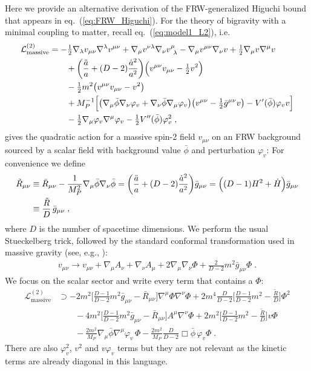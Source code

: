 \documentclass[11pt,a4paper]{article}
\newcommand{\ba}[1]{\begin{align} #1 \end{align}}
\newcommand{\bes}[1]{\begin{equation}\begin{split} #1 \end{split}\end{equation}}
\newcommand{\Lcal}{\mathcal{L}}
\newcommand{\MP}{M_P}
\newcommand{\eref}[1]{eq.~(\ref{#1})}
\begin{document}
\begin{appendix}
Here we provide an alternative derivation of the FRW-generalized Higuchi bound that appears in \eref{eq:FRW_Higuchi}.  For the theory of bigravity with a minimal coupling to matter, recall  \eref{eq:model1_L2}, i.e. 
\bes{
    \Lcal_\mathrm{massive}^{(2)}
    & = 
    -\tfrac{1}{2} \nabla_\lambda v_{\mu\nu} \nabla^\lambda v^{\mu\nu} 
    + \nabla_\mu v^{\nu\lambda} \nabla_\nu v^\mu_{~ \lambda} 
    - \nabla_\mu v^{\mu\nu} \nabla_\nu v 
    + \tfrac{1}{2} \nabla_\mu v \nabla^\mu v 
    \\ & \qquad 
    + \biggl( \frac{\ddot{a}}{a}+(D-2)\frac{\dot{a}^2}{a^2} \biggr)
    \Bigl( v^{\mu\nu} v_{\mu\nu} -\tfrac{1}{2} v^2 \Bigr) 
    \\ & \qquad 
    - \tfrac{1}{2}m^2 \bigl( v^{\mu\nu} v_{\mu\nu} - v^2 \bigr) 
    \\ & \qquad 
    + \MP^{-1} \Bigl[ \bigl( \nabla_\mu \bar{\phi} \nabla_\nu \varphi_v+\nabla_\nu \bar{\phi} \nabla_\mu \varphi_v \bigr) \bigl( v^{\mu\nu} - \tfrac{1}{2} \bar{g}^{\mu\nu} v \bigr) -V'(\bar{\phi}) \varphi_v v \Bigr] 
    \\ & \qquad 
    - \tfrac{1}{2} \nabla_\mu \varphi_v \nabla^\mu \varphi_v 
    - \tfrac{1}{2} V''(\bar{\phi}) \varphi_v^2
    \;,
}
gives the quadratic action for a massive spin-2 field $v_{\mu\nu}$ on an FRW background sourced by a scalar field with background value $\bar{\phi}$ and perturbation $\varphi_v$: 
For convenience we define
\ba{
    \tilde{R}_{\mu\nu} 
    & \equiv \bar{R}_{\mu\nu} - \frac{1}{\MP^2} \nabla_\mu \bar{\phi} \nabla_\nu \bar{\phi} 
    = \biggl( \frac{\ddot{a}}{a} + (D-2) \frac{\dot{a}^2}{a^2} \biggr) \bar{g}_{\mu\nu} 
    = \Bigl( (D-1) H^2 + \dot{H} \Bigr) \bar{g}_{\mu\nu} \\
    & \equiv \frac{\tilde{R}}{D} \, \bar{g}_{\mu\nu}
    \;,
}
where $D$ is the number of spacetime dimensions.  
We perform the usual Stueckelberg trick, followed by the standard conformal transformation used in massive gravity (see, e.g., \cite{Hinterbichler:2011tt}):
\ba{
    v_{\mu\nu} \rightarrow v_{\mu\nu} + \nabla_\mu A_\nu + \nabla_\nu A_\mu + 2 \nabla_\mu \nabla_\nu \Phi + \frac{2}{D-2} m^2 \bar{g}_{\mu\nu} \Phi 
    \;.
}
We focus on the scalar sector and write every term that contains a $\Phi$:
\bes{
    \Lcal_\mathrm{massive}^{(2)}
    & \supset 
    -2m^2 \biggl[ \frac{D-1}{D-2} m^2 \bar{g}_{\mu\nu} - \bar{R}_{\mu\nu} \biggr] \nabla^\mu \Phi \nabla^\nu \Phi 
    + 2 m^4 \frac{D}{D-2} \biggl[ \frac{D-1}{D-2}m^2-\frac{\tilde{R}}{D} \biggr] \Phi^2 
    \\ & \qquad 
    -4 m^2 \biggl[ \frac{D-1}{D-2} m^2 \bar{g}_{\mu\nu} - \bar{R}_{\mu\nu} \biggr] A^\mu \nabla^\nu \Phi 
    + 2 m^2 \biggl[ \frac{D-1}{D-2} m^2 - \frac{\tilde{R}}{D} \biggr] v \Phi 
    \\ & \qquad 
    - \frac{2m^2}{\MP} \nabla_\mu \bar{\phi} \nabla^\mu \varphi_v \, \Phi - \frac{2m^2}{\MP} \frac{D}{D-2} \Box \bar{\phi} \, \varphi_v \Phi 
    \;.
}
There are also $\varphi_v^2$, $v^2$ and $v \varphi_v$ terms but they are not relevant as the kinetic terms are already diagonal in this language. 


\end{appendix}
\end{document}
